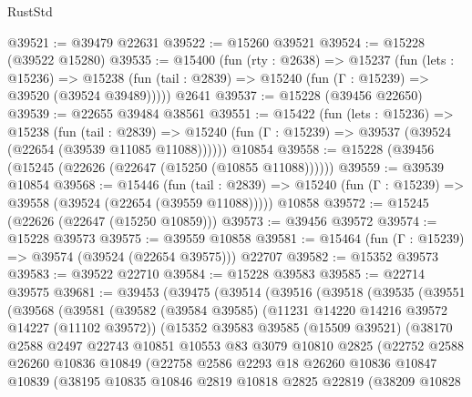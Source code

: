 \begin{lexlean}{RustStd}
\begin{coremodule}
@39521 := @39479 @22631
@39522 := @15260 @39521
@39524 := @15228 (@39522 @15280)
@39535 := @15400
    (fun (rty : @2638) =>
    @15237
      (fun (lets : @15236) =>
      @15238 (fun (tail : @2839) => @15240 (fun (Γ : @15239) => @39520 (@39524 @39489)))))
    @2641
@39537 := @15228 (@39456 @22650)
@39539 := @22655 @39484 @38561
@39551 := @15422
    (fun (lets : @15236) =>
    @15238
      (fun (tail : @2839) =>
      @15240 (fun (Γ : @15239) => @39537 (@39524 (@22654 (@39539 @11085 @11088))))))
    @10854
@39558 := @15228 (@39456 (@15245 (@22626 (@22647 (@15250 (@10855 @11088))))))
@39559 := @39539 @10854
@39568 := @15446
    (fun (tail : @2839) => @15240 (fun (Γ : @15239) => @39558 (@39524 (@22654 (@39559 @11088)))))
    @10858
@39572 := @15245 (@22626 (@22647 (@15250 @10859)))
@39573 := @39456 @39572
@39574 := @15228 @39573
@39575 := @39559 @10858
@39581 := @15464 (fun (Γ : @15239) => @39574 (@39524 (@22654 @39575))) @22707
@39582 := @15352 @39573
@39583 := @39522 @22710
@39584 := @15228 @39583
@39585 := @22714 @39575
@39681 := @39453
    (@39475
      (@39514
        (@39516
          (@39518
            (@39535
              (@39551
                (@39568
                  (@39581
                    (@39582
                      (@39584 @39585)
                      (@11231 @14220 @14216 @39572 @14227 (@11102 @39572))
                      (@15352
                        @39583
                        @39585
                        (@15509 @39521)
                        (@38170
                          @2588
                          @2497
                          @22743
                          @10851
                          @10553
                          @83
                          @3079
                          @10810
                          @2825
                          (@22752
                            @2588
                            @26260
                            @10836
                            @10849
                            (@22758
                              @2586
                              @2293
                              @18
                              @26260
                              @10836
                              @10847
                              @10839
                              (@38195
                                @10835
                                @10846
                                @2819
                                @10818
                                @2825
                                @22819
                                (@38209
                                  @10828

\end{coremodule}
\end{lexlean}
